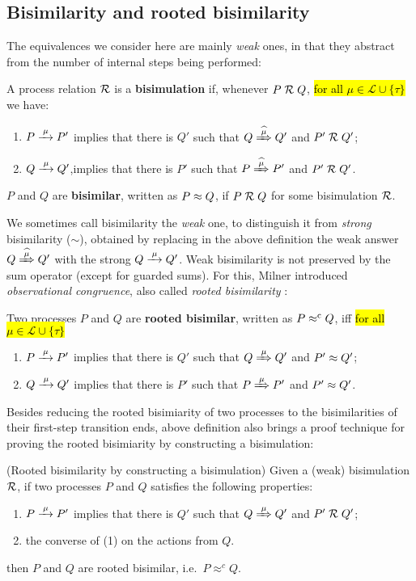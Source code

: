 \subsection{Bisimilarity and rooted bisimilarity}
\label{ss:BiEx}

The equivalences we consider here are mainly \emph{weak} ones, in that they
abstract from the number of internal steps being performed:
\begin{definition}%
\label{d:wb}
A process relation ${{\cal R}}$ is a \textbf{bisimulation} if, whenever
 $P\mathrel{\cal R} Q$, \hl{for all $\mu\in \mathscr{L}\cup\{\tau\}$} we have:
\begin{enumerate}
\item $P \arr\mu P'$ implies that there is $Q'$ such that $Q \Arcap \mu Q'$ and $P' \mathrel{\cal R} Q'$;
\item $Q \arr\mu Q'$,implies that there is $P'$ such that $P \Arcap
  \mu P'$ and $P' \mathrel{\cal R} Q'$\enspace.
\end{enumerate}
 $P$ and $Q$ are \textbf{bisimilar},
written as $P \approx Q$, if $P \mathrel{\cal R} Q$ for some bisimulation ${\cal R}$.
\end{definition}

We sometimes call bisimilarity the \emph{weak} one, to
distinguish it from \emph{strong} bisimilarity ($\sim$),
obtained by replacing in the above definition   the weak answer $
Q\Arcap\mu Q'$ with the strong  $Q \arr \mu Q'$.
Weak bisimilarity is not preserved by the sum operator (except for
guarded sums). For this, Milner introduced \emph{observational congruence}, also called \emph{rooted
  bisimilarity} \cite{Gorrieri:2015jt,Sangiorgi:2011ut}:
\begin{definition}%
\label{d:rootedBisimilarity}
Two processes $P$ and $Q$ are \textbf{rooted bisimilar}, written as $P
\mathrel{\approx^{\rm{c}}} Q$, iff \hl{for all $\mu\in \mathscr{L}\cup\{\tau\}$}
\begin{enumerate}
 \item  $P \arr\mu P'$ implies that there is $Q'$ such that $Q
   \Arr\mu Q'$ and $P' \approx Q'$;
 \item  $Q \arr\mu Q'$ implies that there is $P'$ such that $P
   \Arr\mu P'$ and $P' \approx Q'$\enspace.
\end{enumerate}
\end{definition}

Besides reducing the rooted bisimiarity of two processes to
the bisimilarities of their first-step transition ends, above definition also brings a proof technique for proving the rooted bisimiarity by constructing a bisimulation:
\begin{lemma}{(Rooted bisimilarity by constructing a bisimulation)}
\label{l:obsCongrByWeakBisim}
Given a (weak) bisimulation $\mathrel{\cal R}$, if two processes $P$ and $Q$
satisfies the following properties:
\begin{enumerate}
\item $P \arr\mu P'$ implies that there is $Q'$ such that $Q
   \Arr\mu Q'$ and $P' \mathrel{\cal R} Q'$;
\item the converse of (1) on the actions from $Q$.
\end{enumerate}
then $P$ and $Q$ are rooted bisimilar, i.e.~$P \approx^c Q$.
\end{lemma}

